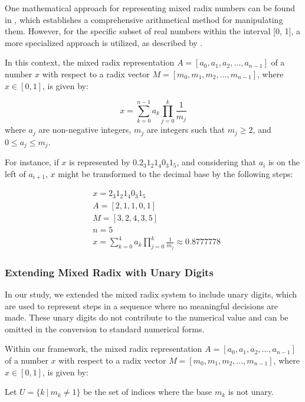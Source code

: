 One mathematical approach for representing mixed radix numbers can be found in ,
which establishes a comprehensive arithmetical method for manipulating them.  However,
for the specific subset of real numbers within the interval [0, 1], a more specialized approach is utilized, as described by .

In this context, the mixed radix representation $A=[a_{0},a_{1},a_{2},...,a_{n-1}]$ 
of a number $x$ with respect to a radix vector $M=[m_{0},m_{1},m_{2},...,m_{n-1}]$,
where $x \in [0,1]$, is given by:

\begin{equation}
	x = \sum_{k=0}^{n-1} a_{k} \prod_{j=0}^{k} \frac{1}{m_j}
\end{equation}
where $a_j$ are non-negative integers, $m_j$ are integers such that $m_j \geq 2$, and $0 \leq a_j \leq m_j$. \cite{Arthur2023}


For instance, if $x$ is represented by $0.2_{3}1_{2}1_{4}0_{3}1_{5}$, and considering that $a_{i}$ is on the left of $a_{i+1}$, $x$ might be transformed to the decimal base by the following steps:

\begin{align}
& x=2_{3}1_{2}1_{4}0_{3}1_{5}\\
& A=[2,1,1,0,1]\\
& M=[3,2,4,3,5]\\
& n=5\\
& x = \sum_{k=0}^{4} a_{k} \prod_{j=0}^{k} \frac{1}{m_j} \approx 0.8777778
\end{align}

\subsubsection{Extending Mixed Radix with Unary Digits}
\label{section_definitions_unary_mixed_radix}

In our study, we extended the mixed radix system to include unary digits,
which are used to represent steps in a sequence where no meaningful decisions are made.
These unary digits do not contribute to the numerical value and can be omitted in the conversion to standard numerical forms.

Within our framework, the mixed radix representation $A=[a_{0},a_{1},a_{2},...,a_{n-1}]$ 
of a number $x$ with respect to a radix vector $M=[m_{0},m_{1},m_{2},...,m_{n-1}]$,
where $x \in [0,1]$, is given by:

Let  $U = \{ k \ |\ m_k \neq 1 \} $ be the set of indices where the base \( m_k \) is not unary.

